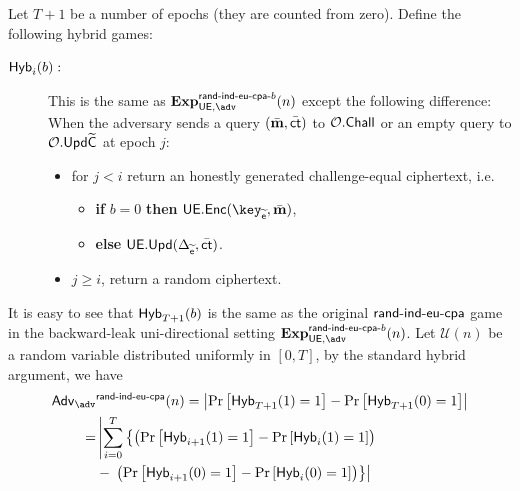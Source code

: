 \documentclass{fundam}
\begin{document}
Let $T+1$ be a number of epochs (they are counted from zero). Define the following hybrid games: 
\begin{description}
	\item[$\mathsf{Hyb}_{i}(b):$] This is the same as $\Exp{\UE,\adv}{\EUmod{b}}(n)$ except the following difference: When the adversary sends a query $(\bar{\mathbf{m}}, \bar{\mathsf{ct}})$ to $\mathcal{O}.\mathsf{Chall}$ or an empty query to $\mathcal{O}.\mathsf{Upd}\widetilde{\mathsf{C}}$ at epoch $j$:
	\begin{itemize}
		\item for $j<i$ return an honestly generated challenge-equal ciphertext, i.e. 
		\begin{itemize}
			\item[{}] \textbf{if} $b=0$ \textbf{then} $\ueenc(\key_{\widetilde{\epoch}}, \bar{\m})$,
			\item[{}] \textbf{else} $\mathsf{UE.Upd}(\Delta_{\widetilde{\mathsf{e}}}, \bar{\mathsf{ct}})$. 
		\end{itemize}
		\item $j\geq i$, return a random ciphertext.
	\end{itemize}
\end{description}
It is easy to see that $\mathsf{Hyb}_{T+1}(b)$ is the same as the original $\mathsf{rand{\text{-}} ind{\text{-}} eu{\text{-}} cpa}$	game in the backward-leak uni-directional setting $\Exp{\UE,\adv}{\EUmod{b}}(n)$. Let $\mathcal{U} (n)$ be a random variable distributed uniformly in $[0,T]$, by the standard hybrid argument, we have
\begin{align*}
	\Adv_{\adv}&^{\EUS}(n) = \left| \Pr\left[ \tx{Hyb}_{T+1}(1)=1 \right]   -  \Pr\left[ \tx{Hyb}_{T+1}(0)=1 \right]   \right| \nonumber\\
	=&\left|  \sum_{i=0}^{T} \left\{   \left(  \Pr\left[   \tx{Hyb}_{i+1}(1)=1 \right]   -   \Pr\left[   \tx{Hyb}_{i}(1)=1 \right] \right) \right. \right. \nonumber\\
	& -   \left.\left. \left(  \Pr\left[   \tx{Hyb}_{i+1}(0)=1 \right]   -   \Pr\left[   \tx{Hyb}_{i}(0)=1 \right] \right)   \right\} \right|  
\end{align*}	
%
\end{document}
